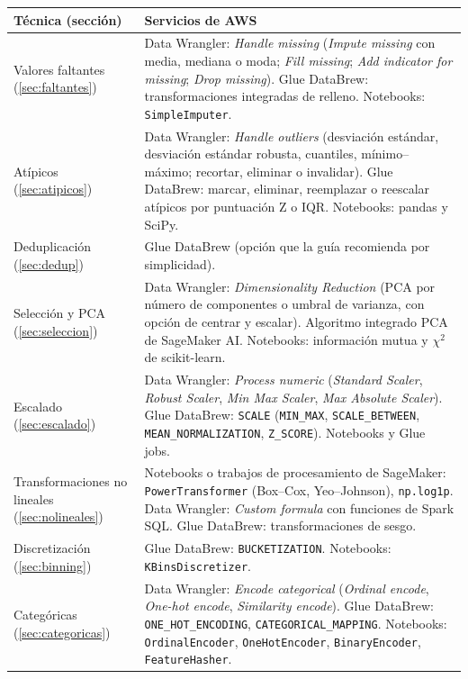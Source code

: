 \documentclass[11pt]{article}
\theoremstyle{definition}
\theoremstyle{remark}
\begin{document}
\begin{center}
\small
\begin{tabularx}{\linewidth}{@{}>{\raggedright\arraybackslash}p{3.4cm}Y@{}}
\toprule
Técnica (sección) & Servicios de AWS\\
\midrule
Valores faltantes (\ref{sec:faltantes}) & Data Wrangler: \emph{Handle missing} (\emph{Impute missing} con media, mediana o moda; \emph{Fill missing}; \emph{Add indicator for missing}; \emph{Drop missing}). Glue DataBrew: transformaciones integradas de relleno. Notebooks: \texttt{SimpleImputer}.\\
Atípicos (\ref{sec:atipicos}) & Data Wrangler: \emph{Handle outliers} (desviación estándar, desviación estándar robusta, cuantiles, mínimo--máximo; recortar, eliminar o invalidar). Glue DataBrew: marcar, eliminar, reemplazar o reescalar atípicos por puntuación Z o IQR. Notebooks: pandas y SciPy.\\
Deduplicación (\ref{sec:dedup}) & Glue DataBrew (opción que la guía recomienda por simplicidad).\\
Selección y PCA (\ref{sec:seleccion}) & Data Wrangler: \emph{Dimensionality Reduction} (PCA por número de componentes o umbral de varianza, con opción de centrar y escalar). Algoritmo integrado PCA de SageMaker AI. Notebooks: información mutua y $\chi^2$ de scikit-learn.\\
Escalado (\ref{sec:escalado}) & Data Wrangler: \emph{Process numeric} (\emph{Standard Scaler}, \emph{Robust Scaler}, \emph{Min Max Scaler}, \emph{Max Absolute Scaler}). Glue DataBrew: \texttt{SCALE} (\texttt{MIN\_MAX}, \texttt{SCALE\_BETWEEN}, \texttt{MEAN\_NORMALIZATION}, \texttt{Z\_SCORE}). Notebooks y Glue jobs.\\
Transformaciones no lineales (\ref{sec:nolineales}) & Notebooks o trabajos de procesamiento de SageMaker: \texttt{PowerTransformer} (Box--Cox, Yeo--Johnson), \texttt{np.log1p}. Data Wrangler: \emph{Custom formula} con funciones de Spark SQL. Glue DataBrew: transformaciones de sesgo.\\
Discretización (\ref{sec:binning}) & Glue DataBrew: \texttt{BUCKETIZATION}. Notebooks: \texttt{KBinsDiscretizer}.\\
Categóricas (\ref{sec:categoricas}) & Data Wrangler: \emph{Encode categorical} (\emph{Ordinal encode}, \emph{One-hot encode}, \emph{Similarity encode}). Glue DataBrew: \texttt{ONE\_HOT\_ENCODING}, \texttt{CATEGORICAL\_MAPPING}. Notebooks: \texttt{OrdinalEncoder}, \texttt{OneHotEncoder}, \texttt{BinaryEncoder}, \texttt{FeatureHasher}.\\

\end{tabularx}
\end{center}
\end{document}
